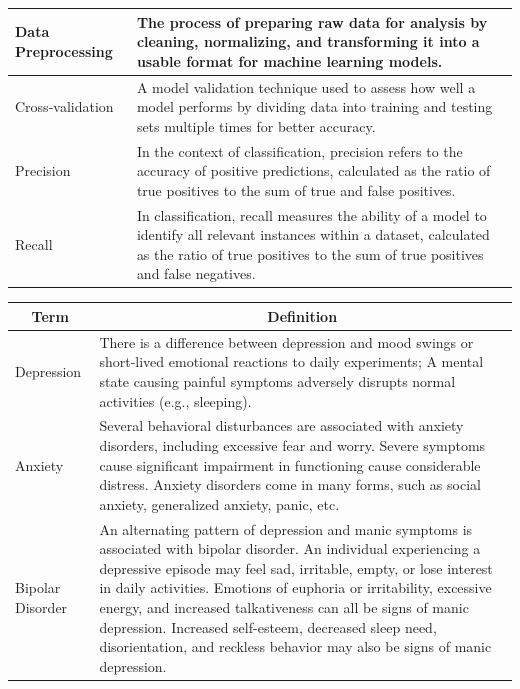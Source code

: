 \begin{center}
\begin{tabular}{|p{4cm}|p{10cm}|}
  \hline
  Data Preprocessing & The process of preparing raw data for analysis by cleaning, normalizing, and transforming it into a usable format for machine learning models. \\

  \hline 
  Cross-validation & A model validation technique used to assess how well a model performs by dividing data into training and testing sets multiple times for better accuracy. \\

  \hline
  Precision & In the context of classification, precision refers to the accuracy of positive predictions, calculated as the ratio of true positives to the sum of true and false positives. \\

  \hline
  Recall & In classification, recall measures the ability of a model to identify all relevant instances within a dataset, calculated as the ratio of true positives to the sum of true positives and false negatives. \\
  
  \hline
\end{tabular}

\pagebreak

\begin{tabular}{|p{4cm}|p{10cm}|}
  \hline
  \multicolumn{1}{|c|}{\textbf{Term}} & \multicolumn{1}{c|}{\textbf{Definition}} \\

  \hline
  Depression & There is a difference between depression and mood swings or short-lived emotional reactions to daily experiments; A mental state causing painful symptoms adversely disrupts normal activities (e.g., sleeping). \\

  \hline
  Anxiety & Several behavioral disturbances are associated with anxiety disorders, including excessive fear and worry. Severe symptoms cause significant impairment in functioning cause considerable distress. Anxiety disorders come in many forms, such as social anxiety, generalized anxiety, panic, etc. \\

  \hline
  Bipolar Disorder & An alternating pattern of depression and manic symptoms is associated with bipolar disorder. An individual experiencing a depressive episode may feel sad, irritable, empty, or lose interest in daily activities. Emotions of euphoria or irritability, excessive energy, and increased talkativeness can all be signs of manic depression. Increased self-esteem, decreased sleep need, disorientation, and reckless behavior may also be signs of manic depression. \\


\end{tabular}
\end{center}
